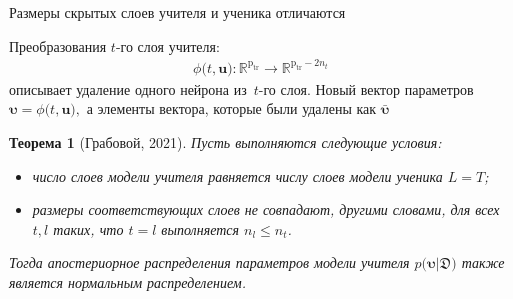 \documentclass[10pt,pdf,hyperref={unicode}]{beamer}
\newtheorem{rustheorem}{Теорема}
\begin{document}
\begin{frame}{Размеры скрытых слоев учителя и ученика отличаются}

Преобразования $t$-го слоя учителя:
\[
\begin{aligned}
\phi\bigr(t, \mathbf{u}\bigr) : \mathbb{R}^{\text{p}_{\text{tr}}} \to \mathbb{R}^{\text{p}_{\text{tr}}-2n_t}
\end{aligned}
\]
описывает удаление одного нейрона из~$t$-го слоя. Новый вектор параметров $\bm{\upsilon} =  \phi\bigr(t, \mathbf{u}\bigr),$ а элементы вектора, которые были удалены как $\bar{\bm{\upsilon}}$

\begin{rustheorem}[Грабовой, 2021]
Пусть выполняются следующие условия:
\begin{itemize}
 распределение параметров $p\bigr(\mathbf{u}|\mathfrak{D}\bigr) = \mathcal{N}\bigr(\mathbf{m}, \bm{\Sigma}\bigr);$
\item число слоев модели учителя равняется числу слоев модели ученика $L=T$;
\item размеры соответствующих слоев не совпадают, другими словами, для всех $t, l$ таких, что $t=l$ выполняется $n_l \leq n_t$.
\end{itemize}
Тогда апостериорное распределения параметров модели учителя $p\bigr(\bm{\upsilon}|\mathfrak{D}\bigr)$ также является нормальным распределением.
\end{rustheorem}

\end{frame}
\end{document}
